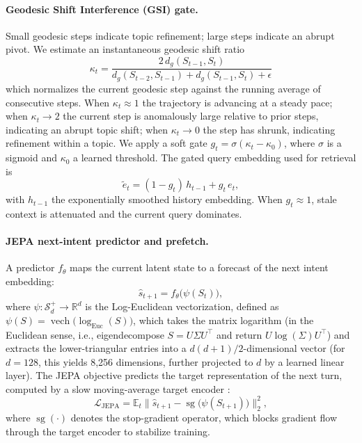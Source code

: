 \documentclass[preprint,12pt]{elsarticle}
\begin{document}
\paragraph{Geodesic Shift Interference (GSI) gate.} Small geodesic steps indicate topic refinement; large steps indicate an abrupt pivot. We estimate an instantaneous geodesic shift ratio
\begin{equation}
\kappa_t = \frac{2\,d_g(S_{t-1},S_t)}{d_g(S_{t-2},S_{t-1}) + d_g(S_{t-1},S_t) + \epsilon}
\label{eq:gsr}
\end{equation}
which normalizes the current geodesic step against the running average of consecutive steps. When $\kappa_t \approx 1$ the trajectory is advancing at a steady pace; when $\kappa_t \to 2$ the current step is anomalously large relative to prior steps, indicating an abrupt topic shift; when $\kappa_t \to 0$ the step has shrunk, indicating refinement within a topic. We apply a soft gate $g_t = \sigma(\kappa_t-\kappa_0)$, where $\sigma$ is a sigmoid and $\kappa_0$ a learned threshold. The gated query embedding used for retrieval is
\begin{equation}
\tilde{e}_t = (1-g_t)\,h_{t-1} + g_t\,e_t,
\label{eq:gate}
\end{equation}
with $h_{t-1}$ the exponentially smoothed history embedding. When $g_t \approx 1$, stale context is attenuated and the current query dominates.

\paragraph{JEPA next-intent predictor and prefetch.} A predictor $f_\theta$ maps the current latent state to a forecast of the next intent embedding:
\begin{equation}
\hat{s}_{t+1} = f_\theta\bigl(\psi(S_t)\bigr),
\label{eq:pred}
\end{equation}
where $\psi:\mathcal{S}_d^+\to\mathbb{R}^d$ is the Log-Euclidean vectorization, defined as $\psi(S) = \operatorname{vech}\bigl(\log_{\mathrm{Euc}}(S)\bigr)$, which takes the matrix logarithm (in the Euclidean sense, i.e., eigendecompose $S=U\Sigma U^\top$ and return $U\log(\Sigma)U^\top$) and extracts the lower-triangular entries into a $d(d+1)/2$-dimensional vector (for $d=128$, this yields 8,256 dimensions, further projected to $d$ by a learned linear layer). The JEPA objective predicts the target representation of the next turn, computed by a slow moving-average target encoder \citep{assran2023_ijepa,grill20}:
\begin{equation}
\mathcal{L}_{\mathrm{JEPA}} = \mathbb{E}_t \bigl\| \hat{s}_{t+1} - \operatorname{sg}\bigl(\psi(S_{t+1})\bigr) \bigr\|_2^2,
\label{eq:jepa}
\end{equation}
where $\operatorname{sg}(\cdot)$ denotes the stop-gradient operator, which blocks gradient flow through the target encoder to stabilize training.
\end{document}
